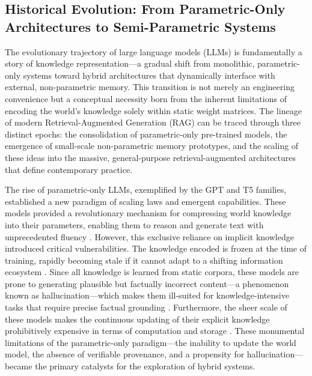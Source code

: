 \documentclass[11pt,a4paper]{article}
\begin{document}
\subsection{Historical Evolution: From Parametric-Only Architectures to Semi-Parametric Systems}


The evolutionary trajectory of large language models (LLMs) is fundamentally a story of knowledge representation---a gradual shift from monolithic, parametric-only systems toward hybrid architectures that dynamically interface with external, non-parametric memory. This transition is not merely an engineering convenience but a conceptual necessity born from the inherent limitations of encoding the world's knowledge solely within static weight matrices. The lineage of modern Retrieval-Augmented Generation (RAG) can be traced through three distinct epochs: the consolidation of parametric-only pre-trained models, the emergence of small-scale non-parametric memory prototypes, and the scaling of these ideas into the massive, general-purpose retrieval-augmented architectures that define contemporary practice.

The rise of parametric-only LLMs, exemplified by the GPT and T5 families, established a new paradigm of scaling laws and emergent capabilities. These models provided a revolutionary mechanism for compressing world knowledge into their parameters, enabling them to reason and generate text with unprecedented fluency \cite{arxiv:2402.06196v2}. However, this exclusive reliance on implicit knowledge introduced critical vulnerabilities. The knowledge encoded is frozen at the time of training, rapidly becoming stale if it cannot adapt to a shifting information ecosystem \cite{arxiv:2311.08401v1,arxiv:2307.10169v1}. Since all knowledge is learned from static corpora, these models are prone to generating plausible but factually incorrect content---a phenomenon known as hallucination---which makes them ill-suited for knowledge-intensive tasks that require precise factual grounding \cite{arxiv:2005.11401v4,arxiv:2310.07521v3}. Furthermore, the sheer scale of these models makes the continuous updating of their explicit knowledge prohibitively expensive in terms of computation and storage \cite{arxiv:2402.01364v2}. These monumental limitations of the parametric-only paradigm---the inability to update the world model, the absence of verifiable provenance, and a propensity for hallucination---became the primary catalysts for the exploration of hybrid systems.
\end{document}

